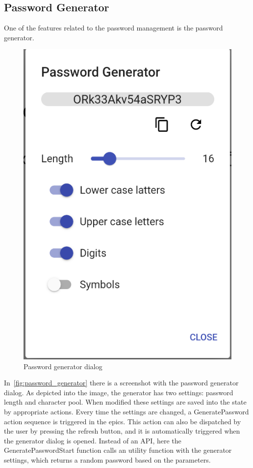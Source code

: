 \documentclass[a4paper,12pt]{report}
\begin{document}
\subsection{Password Generator}

One of the features related to the password management is the password
generator.

\begin{figure}[H]
    \centering
    \includegraphics[scale=0.33]{images/app/password_generator.png}
    \caption{Password generator dialog}\label{fig:password_generator}
\end{figure}

In~\autoref{fig:password_generator} there is a screenshot with the password
generator dialog. As depicted into the image, the generator has two settings:
password length and character pool. When modified these settings are saved into
the state by appropriate actions. Every time the settings are changed, a
GeneratePassword action sequence is triggered in the epics. This action can
also be dispatched by the user by pressing the refresh button, and it is
automatically triggered when the generator dialog is opened. Instead of an API,
here the GeneratePasswordStart function calls an utility function with the
generator settings, which returns a random password based on the parameters.
\end{document}
